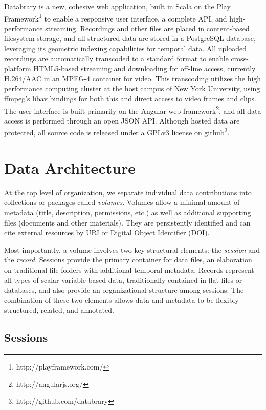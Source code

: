 \documentclass{sig-alternate}
\begin{document}
Databrary is a new, cohesive web application, built in Scala on the Play Framework\footnote{http://playframework.com/} to enable a responsive user interface, a complete API, and high-performance streaming.
Recordings and other files are placed in content-based filesystem storage, and all structured data are stored in a PostgreSQL database, leveraging its geometric indexing capabilities for temporal data.
All uploaded recordings are automatically transcoded to a standard format to enable cross-platform HTML5-based streaming and downloading for off-line access, currently H.264/AAC in an MPEG-4 container for video.
This transcoding utilizes the high performance computing cluster at the host campus of New York University, using ffmpeg's libav bindings for both this and direct access to video frames and clips.
The user interface is built primarily on the Angular web framework\footnote{http://angularjs.org/}, and all data access is performed through an open JSON API.
Although hosted data are protected, all source code is released under a GPLv3 license on github\footnote{http://github.com/databrary}.

\section{Data Architecture}

At the top level of organization, we separate individual data contributions into collections or packages called \emph{volumes}.
Volumes allow a minimal amount of metadata (title, description, permissions, etc.) as well as additional supporting files (documents and other materials).
They are persistently identified and can cite external resources by URI or Digital Object Identifier (DOI).

Most importantly, a volume involves two key structural elements: the \emph{session} and the \emph{record}.
Sessions provide the primary container for data files, an elaboration on traditional file folders with additional temporal metadata.
Records represent all types of scalar variable-based data, traditionally contained in flat files or databases, and also provide an organizational structure among sessions.
The combination of these two elements allows data and metadata to be flexibly structured, related, and annotated.

\subsection{Sessions}
\end{document}
